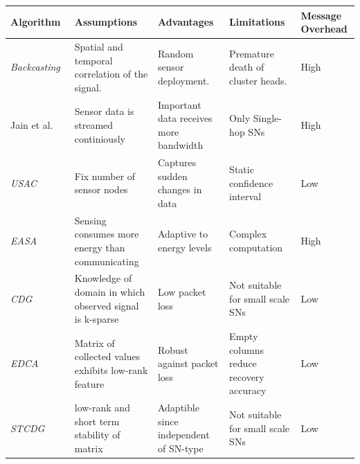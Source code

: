         \def\arraystretch{1.5}%
        \begin{longtable} { |p{}||p{}|p{}|p{}|p{}| } 

        \hline
        Algorithm & Assumptions & Advantages & Limitations & Message Overhead\\
        \hline
        \hline

        \textit{Backcasting}~\cite{willett2004backcasting} & Spatial and
        temporal correlation of the signal. & Random sensor deployment. &
        Premature death of cluster heads. & High\\ %

        Jain et al.~\cite{jain2004adaptive} & Sensor data is streamed
        continiously & Important data receives more bandwidth & Only Single-hop
        \acp{SN} & High\\ %

        \textit{USAC}~\cite{padhy2006utility}& Fix number of sensor nodes &
        Captures sudden changes in data & Static confidence
        interval~\cite{kho2007decentralised} & Low\\ %

        \textit{EASA}~\cite{srbinovski2016energy}& Sensing consumes more energy
        than communicating & Adaptive to energy levels & Complex computation &
        High\\ %

        \textit{CDG}~\cite{luo2009compressive}& Knowledge of domain in which
        observed signal is k-sparse & Low packet loss & Not suitable for small
        scale \acp{SN} & Low\\ %

        \textit{EDCA}~\cite{cheng2010efficient}& Matrix of collected values
        exhibits low-rank feature & Robust against packet loss & Empty columns
        reduce recovery accuracy~\cite{cheng2013stcdg} & Low\\ %

        \textit{STCDG}~\cite{cheng2013stcdg}& low-rank and short term stability of
        matrix & Adaptible since independent of \ac{SN}-type & Not suitable for
        small scale \acp{SN}~\cite{yi2015partial} & Low\\ %


\end{longtable}
